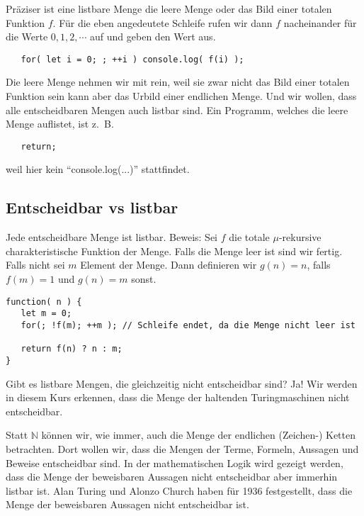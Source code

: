 \documentclass[a4paper]{amsart}
\theoremstyle{definition}
\newcommand{\N}{\ensuremath{\mathbb{ N }}}
\newcommand{\zb}{z.~B. }
\begin{document}
Präziser ist eine listbare Menge die leere Menge oder das Bild einer totalen Funktion $f$. Für die eben angedeutete Schleife rufen wir dann $f$ nacheinander für die Werte $0, 1, 2, \cdots $ auf und geben den Wert aus.
\begin{lstlisting}
   for( let i = 0; ; ++i ) console.log( f(i) );
\end{lstlisting}

Die leere Menge nehmen wir mit rein, weil sie zwar nicht das Bild einer totalen Funktion sein kann aber das Urbild einer endlichen Menge. Und wir wollen, dass alle entscheidbaren Mengen auch listbar sind. Ein Programm, welches die leere Menge auflistet, ist \zb
\begin{lstlisting}
   return;
\end{lstlisting}
weil hier kein "`console.log(...)"' stattfindet.

\subsection{Entscheidbar vs listbar}
Jede entscheidbare Menge ist listbar. Beweis: Sei $f$ die totale $\mu$-rekursive charakteristische Funktion der Menge. Falls die Menge leer ist sind wir fertig. Falls nicht sei $m$ Element der Menge. Dann definieren wir $g(n) = n$, falls $f(m) = 1$ und $g(n) = m$ sonst. 
\begin{lstlisting}
function( n ) {
   let m = 0;  
   for(; !f(m); ++m ); // Schleife endet, da die Menge nicht leer ist
   
   return f(n) ? n : m;
}
\end{lstlisting}

Gibt es listbare Mengen, die gleichzeitig nicht entscheidbar sind? Ja! Wir werden in diesem Kurs erkennen, dass die Menge der haltenden Turingmaschinen nicht entscheidbar. 

Statt $\N$ können wir, wie immer, auch die Menge der endlichen (Zeichen-) Ketten betrachten. Dort wollen wir, dass die Mengen der Terme, Formeln, Aussagen und Beweise entscheidbar sind. In der mathematischen Logik wird gezeigt werden, dass die Menge der beweisbaren Aussagen nicht entscheidbar aber immerhin listbar ist. Alan Turing und Alonzo Church haben für 1936 festgestellt, dass die Menge der beweisbaren Aussagen nicht entscheidbar ist.
\end{document}
